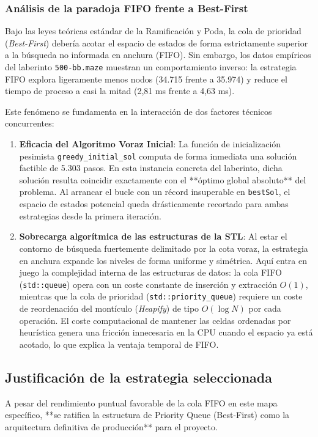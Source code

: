 \documentclass[11pt,a4paper]{article}
\begin{document}
\subsubsection{Análisis de la paradoja FIFO frente a Best-First}
Bajo las leyes teóricas estándar de la Ramificación y Poda, la cola de prioridad (\textit{Best-First}) debería acotar el espacio de estados de forma estrictamente superior a la búsqueda no informada en anchura (FIFO). Sin embargo, los datos empíricos del laberinto \texttt{500-bb.maze} muestran un comportamiento inverso: la estrategia FIFO explora ligeramente menos nodos (34.715 frente a 35.974) y reduce el tiempo de proceso a casi la mitad (2,81 ms frente a 4,63 ms).

Este fenómeno se fundamenta en la interacción de dos factores técnicos concurrentes:
\begin{enumerate}
    \item \textbf{Eficacia del Algoritmo Voraz Inicial}: La función de inicialización pesimista \texttt{greedy\_initial\_sol} computa de forma inmediata una solución factible de 5.303 pasos. En esta instancia concreta del laberinto, dicha solución resulta coincidir exactamente con el **óptimo global absoluto** del problema. Al arrancar el bucle con un récord insuperable en \texttt{bestSol}, el espacio de estados potencial queda drásticamente recortado para ambas estrategias desde la primera iteración.
    \item \textbf{Sobrecarga algorítmica de las estructuras de la STL}: Al estar el contorno de búsqueda fuertemente delimitado por la cota voraz, la estrategia en anchura expande los niveles de forma uniforme y simétrica. Aquí entra en juego la complejidad interna de las estructuras de datos: la cola FIFO (\texttt{std::queue}) opera con un coste constante de inserción y extracción $O(1)$, mientras que la cola de prioridad (\texttt{std::priority\_queue}) requiere un coste de reordenación del montículo (\textit{Heapify}) de tipo $O(\log N)$ por cada operación. El coste computacional de mantener las celdas ordenadas por heurística genera una fricción innecesaria en la CPU cuando el espacio ya está acotado, lo que explica la ventaja temporal de FIFO.
\end{enumerate}

\subsection{Justificación de la estrategia seleccionada}
A pesar del rendimiento puntual favorable de la cola FIFO en este mapa específico, **se ratifica la estructura de Priority Queue (Best-First) como la arquitectura definitiva de producción** para el proyecto. 
\end{document}
